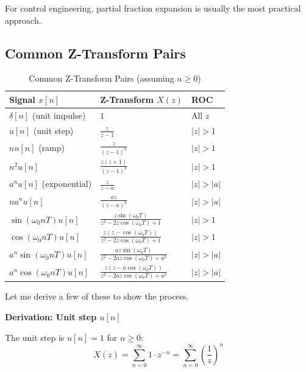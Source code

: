 For control engineering, partial fraction expansion is usually the most practical approach.

\subsection{Common Z-Transform Pairs}

\begin{table}[htbp]
\centering
\caption{Common Z-Transform Pairs (assuming $n \geq 0$)}
\label{tab:z_transform_pairs}
\begin{tabular}{lll}
\toprule
\textbf{Signal $x[n]$} & \textbf{Z-Transform $X(z)$} & \textbf{ROC} \\
\midrule
$\delta[n]$ (unit impulse) & $1$ & All $z$ \\[0.5em]
$u[n]$ (unit step) & $\displaystyle\frac{z}{z-1}$ & $|z| > 1$ \\[1em]
$n u[n]$ (ramp) & $\displaystyle\frac{z}{(z-1)^2}$ & $|z| > 1$ \\[1em]
$n^2 u[n]$ & $\displaystyle\frac{z(z+1)}{(z-1)^3}$ & $|z| > 1$ \\[1em]
$a^n u[n]$ (exponential) & $\displaystyle\frac{z}{z-a}$ & $|z| > |a|$ \\[1em]
$n a^n u[n]$ & $\displaystyle\frac{az}{(z-a)^2}$ & $|z| > |a|$ \\[1em]
$\sin(\omega_0 n T) u[n]$ & $\displaystyle\frac{z \sin(\omega_0 T)}{z^2 - 2z\cos(\omega_0 T) + 1}$ & $|z| > 1$ \\[1em]
$\cos(\omega_0 n T) u[n]$ & $\displaystyle\frac{z(z - \cos(\omega_0 T))}{z^2 - 2z\cos(\omega_0 T) + 1}$ & $|z| > 1$ \\[1em]
$a^n \sin(\omega_0 n T) u[n]$ & $\displaystyle\frac{az \sin(\omega_0 T)}{z^2 - 2az\cos(\omega_0 T) + a^2}$ & $|z| > |a|$ \\[1em]
$a^n \cos(\omega_0 n T) u[n]$ & $\displaystyle\frac{z(z - a\cos(\omega_0 T))}{z^2 - 2az\cos(\omega_0 T) + a^2}$ & $|z| > |a|$ \\
\bottomrule
\end{tabular}
\end{table}

Let me derive a few of these to show the process.

\textbf{Derivation: Unit step $u[n]$}

The unit step is $u[n] = 1$ for $n \geq 0$:
\begin{equation}
X(z) = \sum_{n=0}^{\infty} 1 \cdot z^{-n} = \sum_{n=0}^{\infty} \left(\frac{1}{z}\right)^n
\end{equation}

